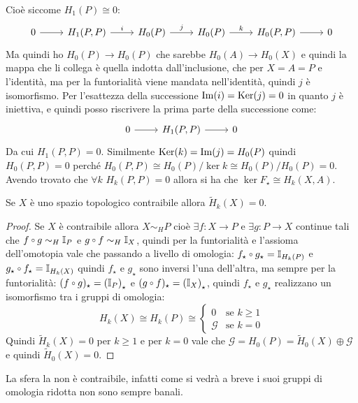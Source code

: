   Cioè siccome $ H_1(P) \cong 0 $:
  \[
    \begin{tikzcd}
       0 \arrow{r}{}         & H_1(P,P) \arrow{r}{i}  & H_{0}(P) \arrow{r}{j}   & H_{0}(P) \arrow{r}{k} & H_{0}(P,P) \rar       & 0
    \end{tikzcd}
  \]
  Ma quindi ho $ H_0(P) \to H_0(P) $ che sarebbe $ H_0(A) \to H_0(X) $ e quindi la
  mappa che li collega è quella indotta dall'inclusione, che per $ X = A = P $ e
  l'identità, ma per la funtorialità viene mandata nell'identità, quindi $ j $ è
  isomorfismo. Per l'esattezza della successione $ \mathrm{Im}( i ) = \mathrm{Ker}( j) = 0 $ in
  quanto $ j $ è iniettiva, e quindi posso riscrivere la prima parte della
  successione come:
  \[
    \begin{tikzcd}
      0 \rar & H_1(P,P) \rar & 0
    \end{tikzcd}
  \]
  Da cui $ H_1(P,P) = 0 $. Similmente $ \mathrm{Ker}( k) = \mathrm{Im}( j ) = H_0(P) $ quindi $ H_0(P,P) = 0 $ perché
  $ H_0(P,P) \cong {H_0(P)} \slash {\ker{k}} \cong {H_0(P)} \slash {H_0(P)} = 0 $.
  Avendo trovato che $ \forall k $ $ H_k(P,P) = 0 $ allora si ha che $ \ker{F_\star} \cong H_k(X,A) $.

\begin{corollary}
  Se $ X $ è uno spazio topologico contraibile allora $ \tilde{H}_k(X) = 0 $.
\end{corollary}
\begin{proof}
  Se $ X $ è contraibile allora $ X \sim_H P $ cioè $ \exists f \colon X \to P $ e $ \exists g \colon P \to X $
  continue tali che $ f \circ g \sim_H \Id{P} $ e $ g \circ f \sim_H \Id{X} $, quindi
  per la funtorialità e l'assioma dell'omotopia vale che passando a livello
  di omologia:
  $ f_\star \circ g_\star = \Id{H_k(P)} $ e  $ g_\star \circ f_\star = \Id{H_k(X)} $
  quindi $ f_\star $ e $ g_\star $ sono inversi l'una dell'altra, ma sempre per la funtorialità:
  $ (f \circ g)_\star = \left( \Id{P} \right)_\star $ e $ (g \circ f)_\star = \left( \Id{X} \right)_\star $,
  quindi $ f_\star $ e $ g_\star $ realizzano un isomorfismo tra i gruppi di omologia:
  \[
   H_k(X) \cong H_k(P) \cong
    \begin{cases}
      0 & \text{se } k \geq 1 \\
      \mathcal{G} & \text{se } k = 0
    \end{cases}
  \]
  Quindi $ \tilde{H}_k(X) = 0 $ per $ k \geq 1 $ e per $ k = 0 $ vale che
  $ \mathcal{G} = H_0(P) = \tilde{H}_0(X) \oplus \mathcal{G} $ e quindi
  $ \tilde{H}_0(X) = 0 $.
\end{proof}
\begin{corollary}
  La sfera la non è contraibile, infatti come si vedrà a breve i suoi gruppi di
  omologia ridotta non sono sempre banali.
\end{corollary}

